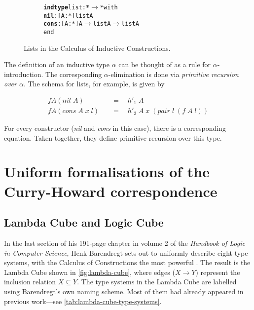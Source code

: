 \documentclass[12pt,toc=bibliography,numbers=noendperiod,
               footnotes=multiple,twoside]{scrartcl}
\begin{document}
\begin{figure}[h]
\centering
\begin{subfigure}[t]{0.4\linewidth}
\begin{alltt}
\textbf{indtype} list : * \(\rightarrow\) * with
    \textbf{nil}  : [A : *] list A
    \textbf{cons} : [A : *] A \(\rightarrow\) list A \(\rightarrow\) list A
end
\end{alltt}
\end{subfigure}
\caption{Lists in the Calculus of Inductive Constructions.}
\label{fig:list-inductive-type}
\end{figure}

The definition of an inductive type \(\alpha\) can be thought of as a rule for \(\alpha\)-introduction. The corresponding \(\alpha\)-elimination is done via \emph{primitive recursion over \(\alpha\)}. The schema for lists, for example, is given by

\begin{align*}
f A (\textit{nil}\;A) \quad &= \quad h'_1\;A \\
f A (\textit{cons}\;A\;x\;l) \quad &= \quad h'_2\;A\;x\;(\textit{pair}\;l\;(f\;A\;l))
\end{align*}

For every constructor (\textit{nil} and \textit{cons} in this case), there is a corresponding equation. Taken together, they define primitive recursion over this type.

\section{Uniform formalisations of the Curry-Howard correspondence}

\subsection{\label{ssc:cubes}Lambda Cube and Logic Cube}

In the last section of his 191-page chapter  in volume 2 of the \textit{Handbook of Logic in Computer Science}, Henk Barendregt sets out to uniformly describe eight type systems, with the Calculus of Constructions the most powerful \autocite{barendregt_lambda_1992}. The result is the Lambda Cube shown in \cref{fig:lambda-cube}, where edges (\(X \longrightarrow Y\)) represent the inclusion relation \(X \subseteq Y\). The type systems in the Lambda Cube are labelled using Barendregt's own naming scheme. Most of them had already appeared in previous work---see \cref{tab:lambda-cube-type-systems}.
\end{document}
